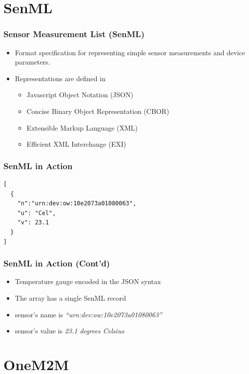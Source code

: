 \documentclass{../iot-lecture}
\begin{document}
\section{SenML}

\begin{frame}
  \frametitle{Sensor Measurement List (SenML)}
  \begin{itemize}
    \item Format specification for representing simple sensor measurements and device parameters.
    \item Representations are defined in
    \begin{itemize}
      \item Javascript Object Notation (JSON)
      \item Concise Binary Object Representation (CBOR)
      \item Extensible Markup Language (XML)
      \item Efficient XML Interchange (EXI)
    \end{itemize}
  \end{itemize}
\end{frame}

\begin{frame}[fragile]
  \frametitle{SenML in Action}
  \begin{verbatim}
[
  {
    "n":"urn:dev:ow:10e2073a01080063",
    "u": "Cel",
    "v": 23.1
  }
]
  \end{verbatim}
\end{frame}

\begin{frame}
  \frametitle{SenML in Action (Cont'd)}
  \begin{itemize}
    \item Temperature gauge encoded in the JSON syntax
    \item The array has a single SenML record
    \item sensor's name is \textit{``urn:dev:ow:10e2073a01080063''}
    \item sensor's value is \textit{23.1 degrees Celsius}
  \end{itemize}
\end{frame}

\section{OneM2M}
\end{document}
